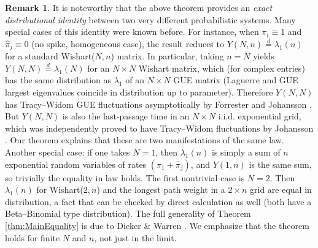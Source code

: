 \documentclass[letterpaper,11pt,oneside,reqno]{article}
\numberwithin{equation}{section}
\theoremstyle{definition}
\newtheorem{remark}[proposition]{Remark}
\begin{document}
\begin{remark}
It is noteworthy that the above theorem provides an \emph{exact distributional identity} between two very different probabilistic systems. Many special cases of this identity were known before. For instance, when $\pi_i\equiv1$ and $\hat\pi_j\equiv0$ (no spike, homogeneous case), the result reduces to $Y(N,n) \stackrel{d}{=} \lambda_1(n)$ for a standard Wishart($N,n$) matrix. In particular, taking $n=N$ yields $Y(N,N) \stackrel{d}{=} \lambda_1(N)$ for an $N\times N$ Wishart matrix, which (for complex entries) has the same distribution as $\lambda_1$ of an $N\times N$ GUE matrix (Laguerre and GUE largest eigenvalues coincide in distribution up to parameter). Therefore $Y(N,N)$ has Tracy--Widom GUE fluctuations asymptotically by Forrester and Johansson \cite{johansson2000shape}. But $Y(N,N)$ is also the last-passage time in an $N\times N$ i.i.d. exponential grid, which was independently proved to have Tracy--Widom fluctuations by Johansson \cite{johansson2000shape}. Our theorem explains that these are two manifestations of the same law. Another special case: if one takes $N=1$, then $\lambda_1(n)$ is simply a sum of $n$ exponential random variables of rates $(\pi_1+\hat\pi_j)$, and $Y(1,n)$ is the same sum, so trivially the equality in law holds. The first nontrivial case is $N=2$. Then $\lambda_1(n)$ for Wishart($2,n$) and the longest path weight in a $2\times n$ grid are equal in distribution, a fact that can be checked by direct calculation as well (both have a Beta--Binomial type distribution). The full generality of Theorem \ref{thm:MainEquality} is due to Dieker \& Warren \cite{diekerWarren2008determinantal}. We emphasize that the theorem holds for finite $N$ and $n$, not just in the limit.
\end{remark}
\end{document}

